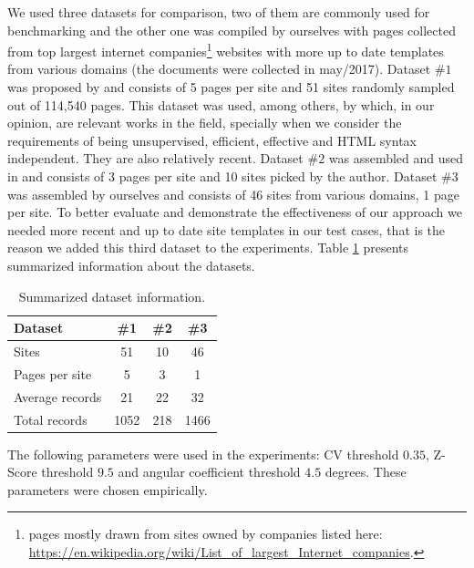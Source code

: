 We used three datasets for comparison, two of them are commonly used for
benchmarking and the other one was compiled by ourselves with pages collected
from top largest internet companies\footnote{pages mostly drawn from sites
owned by companies listed here:
\url{https://en.wikipedia.org/wiki/List_of_largest_Internet_companies}.}
websites with more up to date templates from various domains (the documents were
collected in may/2017). Dataset $\#1$ was proposed by \cite{yamada2004testbed}
and consists of 5 pages per site and 51 sites randomly sampled out of 114,540
pages. This dataset was used, among others, by \cite{TPC09,grigalis2013towards}
which, in our opinion, are relevant works in the field, specially when we
consider the requirements of being unsupervised, efficient, effective and HTML
syntax independent. They are also relatively recent.
Dataset $\#2$ was assembled and used in \cite{grigalis2013towards} and consists
of 3 pages per site and 10 sites picked by the author. Dataset \#3 was assembled
by ourselves and consists of 46 sites from various domains, 1 page per site. To
better evaluate and demonstrate the effectiveness of our approach we needed more
recent and up to date site templates in our test cases, that is the reason we
added this third dataset to the experiments.
Table \ref{table:dataset} presents summarized information about the datasets.


\begin{table}[h]
\centering
\caption{\small{Summarized dataset information.}}
\label{table:dataset}
\begin{small}
\begin{tabular}
{|l| c| c| c|}\hline
Dataset	& \#1	& \#2 & \#3 \\ \hline
Sites &	51 & 10 & 46\\ \hline
Pages per site	& 5 & 3 & 1\\ \hline
Average records & 21 & 22 & 32 \\ \hline
Total records &	1052 & 218 & 1466 \\ \hline
\end{tabular}
\end{small}
\end{table}


The following parameters were used in the experiments: CV threshold $0.35$,
Z-Score threshold $9.5$ and angular coefficient threshold $4.5$ degrees. These
parameters were chosen empirically.

